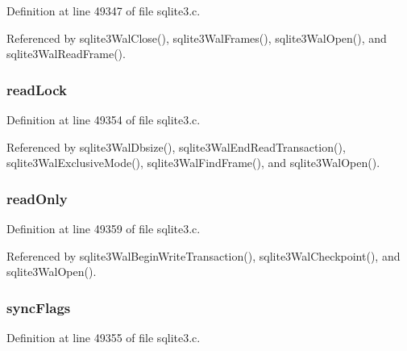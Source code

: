 Definition at line 49347 of file sqlite3.\+c.



Referenced by sqlite3\+Wal\+Close(), sqlite3\+Wal\+Frames(), sqlite3\+Wal\+Open(), and sqlite3\+Wal\+Read\+Frame().

\hypertarget{struct_wal_a9fa541ff052d6a89740302a636c242df}{}
\subsubsection[{read\+Lock}]{ read\+Lock}\label{struct_wal_a9fa541ff052d6a89740302a636c242df}


Definition at line 49354 of file sqlite3.\+c.



Referenced by sqlite3\+Wal\+Dbsize(), sqlite3\+Wal\+End\+Read\+Transaction(), sqlite3\+Wal\+Exclusive\+Mode(), sqlite3\+Wal\+Find\+Frame(), and sqlite3\+Wal\+Open().

\hypertarget{struct_wal_a109225a7975b2a37251bfa2079d3ad59}{}
\subsubsection[{read\+Only}]{ read\+Only}\label{struct_wal_a109225a7975b2a37251bfa2079d3ad59}


Definition at line 49359 of file sqlite3.\+c.



Referenced by sqlite3\+Wal\+Begin\+Write\+Transaction(), sqlite3\+Wal\+Checkpoint(), and sqlite3\+Wal\+Open().

\hypertarget{struct_wal_ac97576f0f90c31296207602245d41195}{}
\subsubsection[{sync\+Flags}]{ sync\+Flags}\label{struct_wal_ac97576f0f90c31296207602245d41195}


Definition at line 49355 of file sqlite3.\+c.

\hypertarget{struct_wal_a79658a9018249026bc019cb526820709}{}
